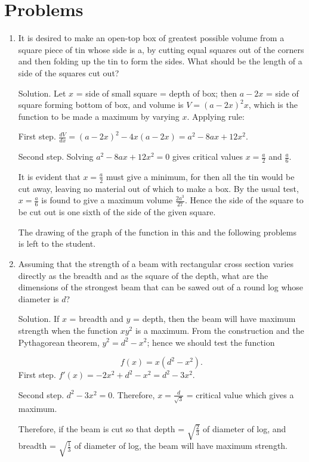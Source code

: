 \section{Problems}

\begin{enumerate}

\item
It is desired to make an open-top box of greatest possible volume 
from a square piece of tin whose side is a, by cutting equal 
squares out of the corners and then folding up the tin to form the 
sides. What should be the length of a side of the squares cut out?

Solution. Let 	$x$ 	= side of small square = depth of box;
then 	$a - 2x$ 	= side of square forming bottom of box,
and volume is 	$V 	= (a - 2x)^2x$,
which is the function to be made a maximum by varying $x$. Applying rule:

First step. $\frac{dV}{dx} = (a - 2x)^2 - 4x(a - 2x) = a^2 - 8ax + 12x^2$.

Second step. Solving $a^2 - 8ax + 12x^2 = 0$ gives critical values 
$x = \frac{a}{2}$ and $\frac{a}{6}$.

It is evident that $x = \frac{a}{2}$ must give a minimum, for 
then all the tin would be cut away, leaving no material out of 
which to make a box. By the usual test, $x = \frac{a}{6}$ is found 
to give a maximum volume $\frac{2a^3}{27}$. Hence the side of the 
square to be cut out is one sixth of the side of the given square.

The drawing of the graph of the function in this 
and the following problems is left to the student.

\item
Assuming that the strength of a beam with rectangular cross section 
varies directly as the breadth and as the square of the depth, 
what are the dimensions of the strongest beam that can be sawed 
out of a round log whose diameter is $d$?

Solution. If $x$ = breadth and $y$ = depth, then the beam will have 
maximum strength when the function $xy^2$ is a maximum. From the 
construction and the Pythagorean theorem, $y^2 = d^2 - x^2$; hence 
we should test the function

\[
    f(x) = x(d^2 - x^2).
\]
First step. $f'(x) = - 2x^2 + d^2 - x^2 = d^2 - 3x^2$.

Second step. $d^2 - 3x^2 = 0$. Therefore, $x = \frac{d}{\sqrt{3}}$ = 
critical value which gives a maximum.

Therefore, if the beam is cut so that depth = $\sqrt{\frac{2}{3}}$ 
of diameter of log, and breadth = $\sqrt{\frac{1}{3}}$ of diameter of log,
the beam will have maximum strength.


\end{enumerate}
